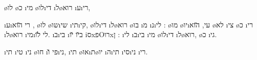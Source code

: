 \o{לו} \o{כ} \i{מי} \o{לו}\i{די} \i{ל}\o{רוא} \i{ע}\i{רי},

 \i{ע}\i{רי} \u{הוא}  ,  \o{לו} \o{שו}\i{שי} \i{תי}\i{קי},  \o{לו}\i{די} \i{ל}\o{רוא} \o{בו} \i{מ} \i{נ}\i{לי} : \o{מו}    \o{יו}\i{עי}, \u{הוא} \o{לא} \i{צי}  \o{כ}  \i{רי}  \i{ל}\o{רוא}  \i{מי}\i{לי} \u{לו}. \i{ב}\i{בי}  \i{ב}\u{יו} \u{יו} iסxפOרוxן : \i{לי}    \i{ב}\i{בי} \i{מי} \o{לו}\i{די} \i{ל}\o{רוא}, \o{כ} \i{גי}.

\i{תי}  \i{טי} \i{ני} \o{חו}  \i{פי} \u{ו}\i{ני}, \i{תי}  \o{או}\i{ת}\o{יו} \i{ה}\i{תי} \i{סי}\i{ני} \i{רי}.

